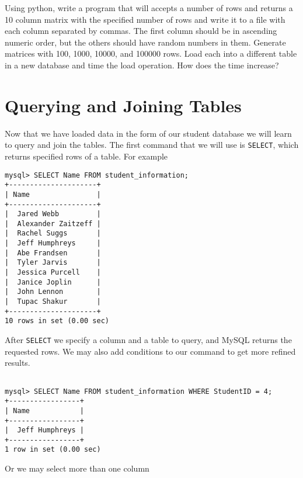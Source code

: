 \begin{problem}

Using python, write a program that will accepts a number of rows and returns a 10 column matrix with the specified number of rows and write it to a file with each column separated by commas.  The first column should be in ascending numeric order, but the others should have random numbers in them.  Generate matrices with 100, 1000, 10000, and 100000 rows.  Load each into a different table in a new database and time the load operation.  How does the time increase?

\end{problem}

\section{Querying and Joining Tables}

Now that we have loaded data in the form of our student database we will learn to query and join the tables.  The first command that we will use is {\tt SELECT}, which returns specified rows of a table.  For example

\begin{lstlisting}
mysql> SELECT Name FROM student_information;
+---------------------+
| Name                |
+---------------------+
|  Jared Webb         |
|  Alexander Zaitzeff |
|  Rachel Suggs       |
|  Jeff Humphreys     |
|  Abe Frandsen       |
|  Tyler Jarvis       |
|  Jessica Purcell    |
|  Janice Joplin      |
|  John Lennon        |
|  Tupac Shakur       |
+---------------------+
10 rows in set (0.00 sec)
\end{lstlisting}

After {\tt SELECT} we specify a column and a table to query, and MySQL returns the requested rows.  We may also add conditions to our command to get more refined results.

\begin{lstlisting}

mysql> SELECT Name FROM student_information WHERE StudentID = 4;
+-----------------+
| Name            |
+-----------------+
|  Jeff Humphreys |
+-----------------+
1 row in set (0.00 sec)

\end{lstlisting}

Or we may select more than one column

